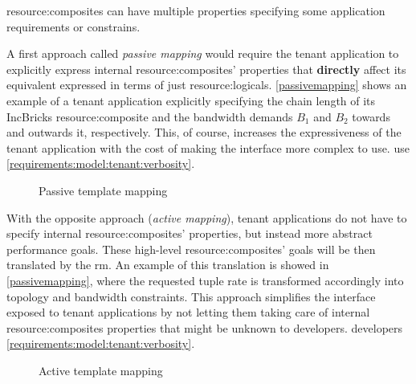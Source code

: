 \Glspl{resource:composite} can have multiple properties specifying some application requirements or constrains.
\ifdefined\THESISSUMMARY \else

\fi
A first approach called \textit{passive mapping} would require the tenant application to explicitly express internal \glspl{resource:composite}' properties that \textbf{directly} affect its equivalent expressed in terms of just \glspl{resource:logical}.
\ifdefined\THESISSUMMARY \else
\autoref{passivemapping} shows an example of a tenant application explicitly specifying the chain length of its IncBricks \cite{incbricks} \gls{resource:composite} and the bandwidth demands $B_1$ and $B_2$ towards and outwards it, respectively.
\fi
This, of course, increases the expressiveness of the tenant application with the cost of making the interface more complex to
\ifdefined\THESISSUMMARY
use.
\else
use \xmark \ref{requirements:model:tenant:verbosity}.
\fi
\ifdefined\THESISSUMMARY \else
\begin{figure}[!htb]
    \centering
    \usebox{\passivemapping}
    \caption{Passive template mapping}
    \label{passivemapping}
\end{figure}
\fi
\ifdefined\THESISSUMMARY \else

\fi
With the opposite approach (\textit{active mapping}), tenant applications do not have to specify internal \glspl{resource:composite}' properties, but instead more abstract performance goals.
These high-level \glspl{resource:composite}' goals will be then translated by the \gls{rm}.
\ifdefined\THESISSUMMARY \else
An example of this translation is showed in \autoref{passivemapping}, where the requested tuple rate is transformed accordingly into topology and bandwidth constraints.
\fi
This approach simplifies the interface exposed to tenant applications by not letting them taking care of internal \glspl{resource:composite} properties that might be unknown to
\ifdefined\THESISSUMMARY
developers.
\else
developers \cmark \ref{requirements:model:tenant:verbosity}.
\fi

\ifdefined\THESISSUMMARY \else
\begin{figure}[!htb]
    \centering
    \usebox{\activemapping}
    \caption{Active template mapping}
    \label{activemapping}
\end{figure}
\fi
